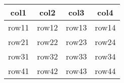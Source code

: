 \documentclass[12pt, a4paper] {article}
\begin{document}
\begin{center}
\begin{tabular}{|| c  c  c  c ||}

 \hline
 col1 & col2 & col3 & col4 \\
 \hline\hline
 row11 & row12 & row13 & row14  \\
 \hline
 row21 & row22 & row23 & row24  \\
 \hline
 row31 & row32 & row33 & row34  \\
 \hline
 row41 & row42 & row43 & row44  \\
 \hline


\end{tabular}
\end{center}
\end{document}
